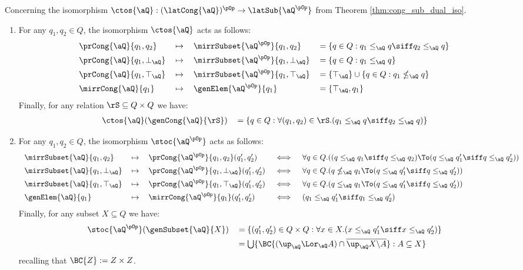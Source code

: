 \documentclass{article}
\begin{document}
\begin{lemma}
\label{lem:jsl_cong_sub_act_on_gen}
Concerning the isomorphism $\ctos{\aQ} : (\latCong{\aQ})^{\pOp} \to \latSub{\aQ^{\pOp}}$ from Theorem \ref{thm:cong_sub_dual_iso}.
\begin{enumerate}
\item
For any $q_1, q_2 \in Q$, the isomorphism $\ctos{\aQ}$ acts as follows:
\[
\begin{tabular}{llll}
$\prCong{\aQ}{q_1,q_2}$
& ${\mapsto}$ 
& $\mirrSubset{\aQ^{\pOp}}{q_1,q_2}$
& $= \{ q \in Q : q_1 \leq_\aQ q \siff q_2 \leq_\aQ q \}$
\\[1ex]
$\prCong{\aQ}{q_1,\bot_\aQ}$
& ${\mapsto}$ 
& $\mirrSubset{\aQ^{\pOp}}{q_1,\bot_\aQ}$
& $= \{ q \in Q : q_1 \leq_\aQ q \}$
\\[1ex]
$\prCong{\aQ}{q_1,\top_\aQ}$
& ${\mapsto}$ 
& $\mirrSubset{\aQ^{\pOp}}{q_1,\top_\aQ}$
& $= \{\top_\aQ \} \cup \{ q \in Q : q_1 \nleq_\aQ q \}$
\\[1ex]
$\mirrCong{\aQ}{q_1}$
& ${\mapsto}$ 
& $\genElem{\aQ^{\pOp}}{q_1}$
& $= \{ \top_\aQ, q_1 \}$
\end{tabular}
\]
Finally, for any  relation $\rS \subseteq Q \times Q$ we have:
\[
\begin{tabular}{lll}
$\ctos{\aQ}(\genCong{\aQ}{\rS}) $
&
$= \{ q \in Q : \forall (q_1,q_2) \in \rS.( q_1 \leq_\aQ q \siff q_2 \leq_\aQ q ) \}$
\end{tabular}
\]

\item
For any $q_1, q_2 \in Q$, the isomorphism $\stoc{\aQ^{\pOp}}$ acts as follows:
\[
\begin{tabular}{lllll}
$\mirrSubset{\aQ}{q_1,q_2}$
& ${\mapsto}$ 
& $\prCong{\aQ^{\pOp}}{q_1,q_2}(q'_1,q'_2)$
& $\iff$ & $\forall q \in Q.( (q \leq_\aQ q_1 \siff q \leq_\aQ q_2) \To (q \leq_\aQ q'_1 \siff q \leq_\aQ q'_2) )$
\\[1ex]
$\mirrSubset{\aQ}{q_1,\bot_\aQ}$
& ${\mapsto}$ 
& $\prCong{\aQ^{\pOp}}{q_1,\bot_\aQ}(q'_1,q'_2)$
& $\iff$ & $\forall q \in Q.( q \nleq_\aQ q_1 \To (q \leq_\aQ q'_1 \siff q \leq_\aQ q'_2))$
\\[1ex]
$\mirrSubset{\aQ}{q_1,\top_\aQ}$
& ${\mapsto}$ 
& $\prCong{\aQ^{\pOp}}{q_1,\top_\aQ}(q'_1,q'_2)$
& $\iff$ & $\forall q \in Q.( q \leq_\aQ q_1 \To (q \leq_\aQ q'_1 \siff q \leq_\aQ q'_2))$
\\[1ex]
$\genElem{\aQ}{q_1}$
& ${\mapsto}$ 
& $\mirrCong{\aQ^{\pOp}}{q_1}(q'_1,q'_2)$
& $\iff$ & $(q_1 \leq_\aQ q'_1 \siff q_1 \leq_\aQ q'_2)$
\end{tabular}
\]
Finally, for any subset $X \subseteq Q$ we have:
\[
\begin{tabular}{lll}
$\stoc{\aQ^{\pOp}}(\genSubset{\aQ}{X})$
&
$= \{ (q'_1,q'_2) \in Q \times Q : \forall x \in X.( x \leq_\aQ q'_1 \siff x \leq_\aQ q'_2 ) \}$
\\[1ex]&
$= \bigcup \{ \BC{(\up_\aQ \Lor_\aQ A) \cap \overline{\up_\aQ X\backslash A}} : A \subseteq X \}$
\end{tabular}
\]
recalling that $\BC{Z} := Z \times Z$.


\end{enumerate}
\end{lemma}
\end{document}
